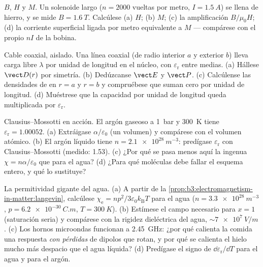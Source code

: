 \begin{exercise}[$\star$]\label{exo:b3:electromagnetism-in-matter:4}
$B$, $H$ y $M$. Un solenoide largo ($n = \num{2000}$ vueltas por metro,
$I = \qty{1.5}{A}$) se llena de hierro, y se mide $B = \qty{1.6}{T}$.
Calcúlese (a) $H$; (b) $M$; (c) la amplificación
$B/\mu_0H$; (d) la corriente superficial ligada por metro equivalente a
$M$ --- compárese con el propio $nI$ de la bobina.
\end{exercise}

\begin{exercise}[$\star\star$]\label{exo:b3:electromagnetism-in-matter:5}
Cable coaxial, aislado. Una línea coaxial (de radio interior $a$ y exterior
$b$) lleva carga libre $\lambda$ por unidad de longitud en el núcleo,
con  $\varepsilon_{\text{r}}$ entre medias. (a) Hállese
$\vect D(r)$ por simetría. (b) Dedúzcanse $\vect E$ y $\vect P$.
(c) Calcúlense las densidades de  en $r = a$ y $r = b$ y
compruébese que suman cero por unidad de longitud. (d) Muéstrese que la capacidad
por unidad de longitud queda multiplicada por $\varepsilon_{\text{r}}$.
\end{exercise}

\begin{exercise}[$\star\star$]\label{exo:b3:electromagnetism-in-matter:6}
Clausius--Mossotti en acción. El argón gaseoso a \qty{1}{bar} y
\qty{300}{K} tiene $\varepsilon_{\text{r}} = 1.00052$. (a) Extráigase
$\alpha/\varepsilon_0$ (un volumen) y compárese con el volumen
atómico. (b) El argón líquido tiene $n = \qty{2.1e28}{m^{-3}}$: predígase
$\varepsilon_{\text{r}}$ con Clausius--Mossotti (medido: 1.53).
(c) ¿Por qué se pasa menos aquí la ingenua $\chi = n\alpha/\varepsilon_0$
que para el agua? (d) ¿Para qué moléculas debe fallar
el esquema entero, y qué lo sustituye?
\end{exercise}

\begin{exercise}[$\star\star$]\label{exo:b3:electromagnetism-in-matter:7}
La permitividad gigante del agua. (a) A partir de la
\cref{prop:b3:electromagnetism-in-matter:langevin}, calcúlese
$\chi_{\text{e}} = np^2/3\varepsilon_0k_{\text{B}}T$ para el agua
($n = \qty{3.3e28}{m^{-3}}$, $p = \qty{6.2e-30}{C.m}$,
$T = \qty{300}{K}$). (b) Estímese el campo necesario para $x = 1$
(saturación seria) y compárese con la rigidez dieléctrica del agua,
$\sim\qty{7e7}{V/m}$. (c) Los hornos microondas funcionan a \qty{2.45}{GHz}:
¿por qué calienta la comida una respuesta \emph{con pérdidas} de dipolos que rotan, y
por qué se calienta el hielo mucho más despacio que el agua líquida? (d) Predígase
el signo de $\dd\varepsilon_{\text{r}}/\dd T$ para el agua y para el
argón.
\end{exercise}

